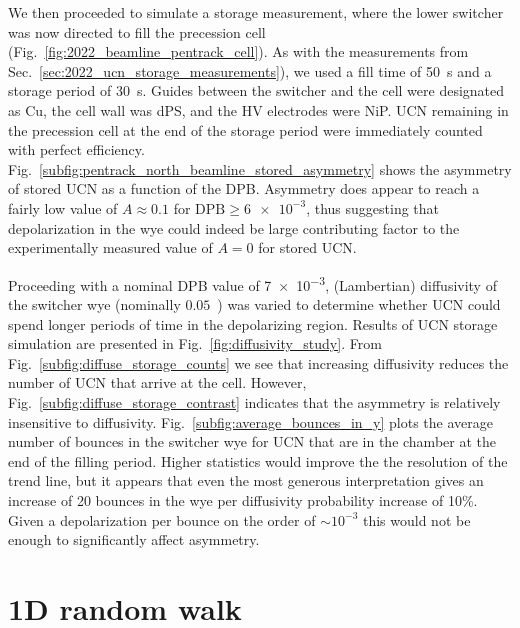 We then proceeded to simulate a storage measurement, where the lower switcher was now directed to fill the precession cell (Fig.~\ref{fig:2022_beamline_pentrack_cell}). As with the measurements from Sec.~\ref{sec:2022_ucn_storage_measurements}), we used a fill time of \qty{50}{s} and a storage period of \qty{30}{s}. Guides between the switcher and the cell were designated as Cu, the cell wall was dPS, and the HV electrodes were NiP. UCN remaining in the precession cell at the end of the storage period were immediately counted with perfect efficiency. Fig.~\ref{subfig:pentrack_north_beamline_stored_asymmetry} shows the asymmetry of stored UCN as a function of the DPB. Asymmetry does appear to reach a fairly low value of $A\approx 0.1$ for $\text{DPB}\geq \num{6e-3}$, thus suggesting that depolarization in the wye could indeed be large contributing factor to the experimentally measured value of $A=0$ for stored UCN.

Proceeding with a nominal DPB value of \num{7e-3}, (Lambertian) diffusivity of the switcher wye (nominally $0.05$~\cite{pattie_jr_evaluation_2017}) was varied to determine whether UCN could spend longer periods of time in the depolarizing region. Results of UCN storage simulation are presented in Fig.~\ref{fig:diffusivity_study}. From Fig.~\ref{subfig:diffuse_storage_counts} we see that increasing diffusivity reduces the number of UCN that arrive at the cell. However, Fig.~\ref{subfig:diffuse_storage_contrast} indicates that the asymmetry is relatively insensitive to diffusivity. Fig.~\ref{subfig:average_bounces_in_y} plots the average number of bounces in the switcher wye for UCN that are in the chamber at the end of the filling period. Higher statistics would improve the the resolution of the trend line, but it appears that even the most generous interpretation gives an increase of 20 bounces in the wye per diffusivity probability increase of 10\%. Given a depolarization per bounce on the order of $\sim 10^{-3}$ this would not be enough to significantly affect asymmetry.


\section{1D random walk}\label{sec:1D_random_walk}


